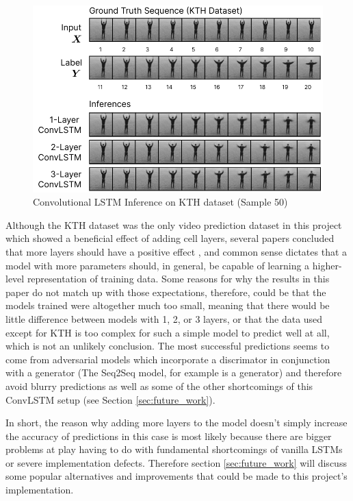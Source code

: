 \documentclass{scrartcl}
\begin{document}
\begin{figure}[H]
	\begin{center}
		\includegraphics[width=1\textwidth]{inferences/kth/kth_inferences_2.png}
	\end{center}
	\caption{Convolutional LSTM Inference on KTH dataset (Sample 50)}
	\label{inf:lstm_kth_inference_2}
\end{figure}

Although the KTH dataset was the only video prediction dataset in this project
which showed a beneficial effect of adding cell layers, several papers
concluded that more layers should have a positive effect \cite{mmnist_dataset,
seq2seq_original}, and common sense dictates that a model with more parameters
should, in general, be capable of learning a higher-level representation of
training data. Some reasons for why the results in this paper do not match up
with those expectations, therefore, could be that the models trained were
altogether much too small, meaning that there would be little difference
between models with 1, 2, or 3 layers, or that the data used except for KTH is
too complex for such a simple model to predict well at all, which is not an
unlikely conclusion. The most successful predictions seems to come from
adversarial models which incorporate a discrimator in conjunction with a
generator (The Seq2Seq model, for example is a generator) and therefore avoid
blurry predictions as well as some of the other shortcomings of this ConvLSTM
setup (see Section \ref{sec:future_work}).

In short, the reason why adding more layers to the model doesn't simply
increase the accuracy of predictions in this case is most likely because there
are bigger problems at play having to do with fundamental shortcomings of
vanilla LSTMs or severe implementation defects. Therefore section
\ref{sec:future_work} will discuss some popular alternatives and improvements
that could be made to this project's implementation.
\end{document}
